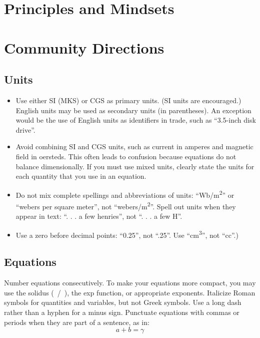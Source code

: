 \documentclass[conference]{IEEEtran}
\begin{document}
\section{Principles and Mindsets}
\label{sec:principles_mindsets}

\section{Community Directions}
\label{sec:community_directions}

\subsection{Units}
\begin{itemize}
\item Use either SI (MKS) or CGS as primary units. (SI units are encouraged.) English units may be used as secondary units (in parentheses). An exception would be the use of English units as identifiers in trade, such as ``3.5-inch disk drive''.
\item Avoid combining SI and CGS units, such as current in amperes and magnetic field in oersteds. This often leads to confusion because equations do not balance dimensionally. If you must use mixed units, clearly state the units for each quantity that you use in an equation.
\item Do not mix complete spellings and abbreviations of units: ``Wb/m\textsuperscript{2}'' or ``webers per square meter'', not ``webers/m\textsuperscript{2}''. Spell out units when they appear in text: ``. . . a few henries'', not ``. . . a few H''.
\item Use a zero before decimal points: ``0.25'', not ``.25''. Use ``cm\textsuperscript{3}'', not ``cc''.)
\end{itemize}

\subsection{Equations}
Number equations consecutively. To make your 
equations more compact, you may use the solidus (~/~), the exp function, or 
appropriate exponents. Italicize Roman symbols for quantities and variables, 
but not Greek symbols. Use a long dash rather than a hyphen for a minus 
sign. Punctuate equations with commas or periods when they are part of a 
sentence, as in:
\begin{equation}
a+b=\gamma\label{eq}
\end{equation}
\end{document}
